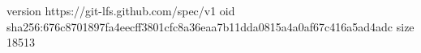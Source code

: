version https://git-lfs.github.com/spec/v1
oid sha256:676c8701897fa4eecff3801cfc8a36eaa7b11dda0815a4a0af67c416a5ad4adc
size 18513
